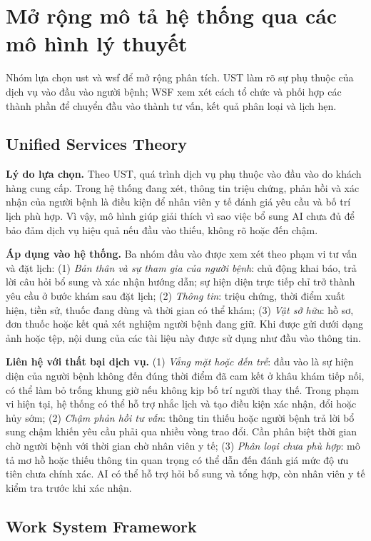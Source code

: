 \section{Mở rộng mô tả hệ thống qua các mô hình lý thuyết}
\noindent Nhóm lựa chọn \gls{ust} và \gls{wsf} để mở rộng phân tích. UST làm rõ sự phụ thuộc của dịch vụ vào đầu vào người bệnh; WSF xem xét cách tổ chức và phối hợp các thành phần để chuyển đầu vào thành tư vấn, kết quả phân loại và lịch hẹn.
\subsection{Unified Services Theory}
\noindent\textbf{Lý do lựa chọn.} Theo UST, quá trình dịch vụ phụ thuộc vào đầu vào do khách hàng cung cấp. Trong hệ thống đang xét, thông tin triệu chứng, phản hồi và xác nhận của người bệnh là điều kiện để nhân viên y tế đánh giá yêu cầu và bố trí lịch phù hợp. Vì vậy, mô hình giúp giải thích vì sao việc bổ sung AI chưa đủ để bảo đảm dịch vụ hiệu quả nếu đầu vào thiếu, không rõ hoặc đến chậm.

\noindent\textbf{Áp dụng vào hệ thống.} Ba nhóm đầu vào được xem xét theo phạm vi tư vấn và đặt lịch: (1) \textit{Bản thân và sự tham gia của người bệnh}: chủ động khai báo, trả lời câu hỏi bổ sung và xác nhận hướng dẫn; sự hiện diện trực tiếp chỉ trở thành yêu cầu ở bước khám sau đặt lịch; (2) \textit{Thông tin}: triệu chứng, thời điểm xuất hiện, tiền sử, thuốc đang dùng và thời gian có thể khám; (3) \textit{Vật sở hữu}: hồ sơ, đơn thuốc hoặc kết quả xét nghiệm người bệnh đang giữ. Khi được gửi dưới dạng ảnh hoặc tệp, nội dung của các tài liệu này được sử dụng như đầu vào thông tin.

\noindent\textbf{Liên hệ với thất bại dịch vụ.} (1) \textit{Vắng mặt hoặc đến trễ}: đầu vào là sự hiện diện của người bệnh không đến đúng thời điểm đã cam kết ở khâu khám tiếp nối, có thể làm bỏ trống khung giờ nếu không kịp bố trí người thay thế. Trong phạm vi hiện tại, hệ thống có thể hỗ trợ nhắc lịch và tạo điều kiện xác nhận, đổi hoặc hủy sớm; (2) \textit{Chậm phản hồi tư vấn}: thông tin thiếu hoặc người bệnh trả lời bổ sung chậm khiến yêu cầu phải qua nhiều vòng trao đổi. Cần phân biệt thời gian chờ người bệnh với thời gian chờ nhân viên y tế; (3) \textit{Phân loại chưa phù hợp}: mô tả mơ hồ hoặc thiếu thông tin quan trọng có thể dẫn đến đánh giá mức độ ưu tiên chưa chính xác. AI có thể hỗ trợ hỏi bổ sung và tổng hợp, còn nhân viên y tế kiểm tra trước khi xác nhận.


\subsection{Work System Framework}

